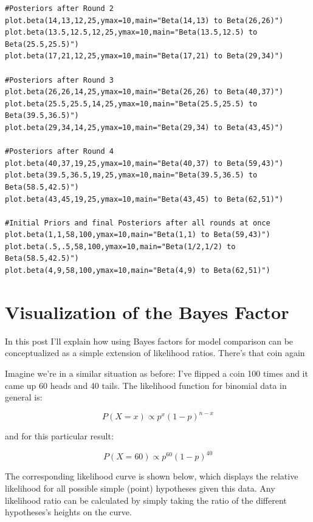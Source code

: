 \begin{lstlisting}
#Posteriors after Round 2
plot.beta(14,13,12,25,ymax=10,main="Beta(14,13) to Beta(26,26)")
plot.beta(13.5,12.5,12,25,ymax=10,main="Beta(13.5,12.5) to Beta(25.5,25.5)")
plot.beta(17,21,12,25,ymax=10,main="Beta(17,21) to Beta(29,34)")

#Posteriors after Round 3
plot.beta(26,26,14,25,ymax=10,main="Beta(26,26) to Beta(40,37)")
plot.beta(25.5,25.5,14,25,ymax=10,main="Beta(25.5,25.5) to Beta(39.5,36.5)")
plot.beta(29,34,14,25,ymax=10,main="Beta(29,34) to Beta(43,45)")

#Posteriors after Round 4
plot.beta(40,37,19,25,ymax=10,main="Beta(40,37) to Beta(59,43)")
plot.beta(39.5,36.5,19,25,ymax=10,main="Beta(39.5,36.5) to Beta(58.5,42.5)")
plot.beta(43,45,19,25,ymax=10,main="Beta(43,45) to Beta(62,51)")

#Initial Priors and final Posteriors after all rounds at once
plot.beta(1,1,58,100,ymax=10,main="Beta(1,1) to Beta(59,43)")
plot.beta(.5,.5,58,100,ymax=10,main="Beta(1/2,1/2) to Beta(58.5,42.5)")
plot.beta(4,9,58,100,ymax=10,main="Beta(4,9) to Beta(62,51)")
\end{lstlisting}

\section{Visualization of the Bayes Factor}
\label{sec:VisualizationoftheBayesFactor}

 In this post I'll explain how using Bayes factors for model comparison can be conceptualized as a simple extension of likelihood ratios.
There's that coin again

Imagine we're in a similar situation as before: I've flipped a coin 100 times and it came up 60 heads and 40 tails. The likelihood function for binomial data in general is:

\begin{equation}P(X=x) \propto p^{x}(1-p)^{n-x}\end{equation}

and for this particular result:

\begin{equation}P(X=60) \propto p^{60}(1-p)^{40}\end{equation}

The corresponding likelihood curve is shown below, which displays the relative likelihood for all possible simple (point) hypotheses given this data. Any likelihood ratio can be calculated by simply taking the ratio of the different hypotheses's heights on the curve.


